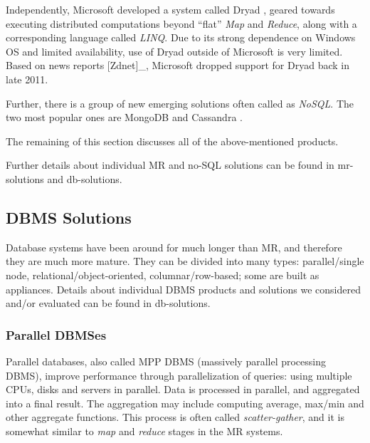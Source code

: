 \documentclass[DM,lsstdraft,toc]{lsstdoc}
\begin{document}
Independently, Microsoft developed a system called
Dryad \citep{Dryad},
geared towards executing distributed computations beyond ``flat''
\emph{Map} and \emph{Reduce}, along with a corresponding language called
\emph{LINQ}. Due to its strong dependence on Windows OS and limited
availability, use of
Dryad
outside of Microsoft is very limited. Based on news reports
{[}Zdnet{]}\_, Microsoft dropped support for
Dryad back
in late 2011.

Further, there is a group of new emerging solutions often called as
\emph{NoSQL}. The two most popular ones are
MongoDB \citep{MongoDB} and
Cassandra \citep{Cassandra}.

The remaining of this section discusses all of the above-mentioned
products.

Further details about individual MR and no-SQL solutions can be found in
mr-solutions and db-solutions.

\subsection{DBMS Solutions}\label{dbms-solutions}

Database systems have been around for much longer than MR, and therefore
they are much more mature. They can be divided into many types:
parallel/single node, relational/object-oriented, columnar/row-based;
some are built as appliances. Details about individual DBMS products and
solutions we considered and/or evaluated can be found in db-solutions.

\subsubsection{Parallel DBMSes}\label{parallel-dbmses}

Parallel databases, also called MPP DBMS (massively parallel processing
DBMS), improve performance through parallelization of queries: using
multiple CPUs, disks and servers in parallel. Data is processed in
parallel, and aggregated into a final result. The aggregation may
include computing average, max/min and other aggregate functions. This
process is often called \emph{scatter-gather}, and it is somewhat
similar to \emph{map} and \emph{reduce} stages in the MR systems.
\end{document}

